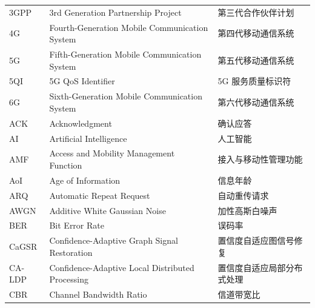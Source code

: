 
\begin{abbreviation}
\label{chap:abbr}

\begin{longtable}{@{} p{} p{} p{} @{}}
  3GPP      & 3rd Generation Partnership Project                              & 第三代合作伙伴计划            \\
  4G        & Fourth-Generation Mobile Communication System                   & 第四代移动通信系统            \\
  5G        & Fifth-Generation Mobile Communication System                    & 第五代移动通信系统            \\
  5QI       & 5G QoS Identifier                                               & 5G 服务质量标识符             \\
  6G        & Sixth-Generation Mobile Communication System                    & 第六代移动通信系统            \\
  ACK       & Acknowledgment                                                  & 确认应答                      \\
  AI        & Artificial Intelligence                                         & 人工智能                      \\
  AMF       & Access and Mobility Management Function                         & 接入与移动性管理功能          \\
  AoI       & Age of Information                                              & 信息年龄                      \\
  ARQ       & Automatic Repeat Request                                        & 自动重传请求                  \\
  AWGN      & Additive White Gaussian Noise                                   & 加性高斯白噪声                \\
  BER       & Bit Error Rate                                                  & 误码率                        \\
  CaGSR     & Confidence-Adaptive Graph Signal Restoration                    & 置信度自适应图信号修复        \\
  CA-LDP    & Confidence-Adaptive Local Distributed Processing                & 置信度自适应局部分布式处理    \\
  CBR       & Channel Bandwidth Ratio                                         & 信道带宽比                    \\

\end{longtable}
\end{abbreviation}
